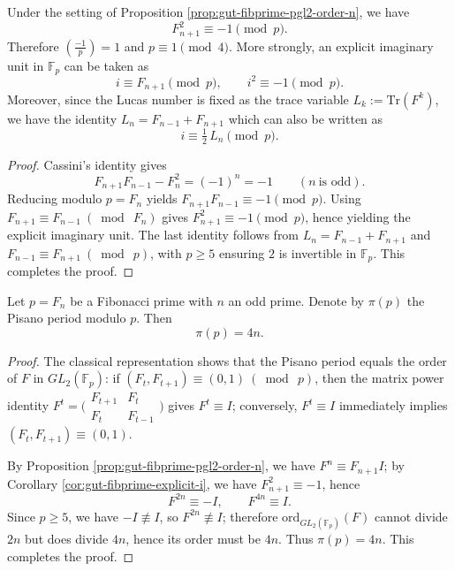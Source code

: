 \begin{corollary}\label{cor:gut-fibprime-explicit-i}
Under the setting of Proposition \ref{prop:gut-fibprime-pgl2-order-n}, we have
\[
F_{n+1}^2\equiv -1\pmod p.
\]
Therefore \(\left(\frac{-1}{p}\right)=1\) and \(p\equiv 1\pmod 4\).
More strongly, an explicit imaginary unit in \(\mathbb{F}_p\) can be taken as
\[
i\equiv F_{n+1}\pmod p,
\qquad i^2\equiv -1\pmod p.
\]
Moreover, since the Lucas number is fixed as the trace variable \(L_k:=\mathrm{Tr}(F^k)\), we have the identity
\(
L_n=F_{n-1}+F_{n+1}
\)
which can also be written as
\[
i\equiv \tfrac12\,L_n\pmod p.
\]
\end{corollary}
\begin{proof}
Cassini's identity gives
\[
F_{n+1}F_{n-1}-F_n^2=(-1)^n=-1
\qquad(n\ \text{is odd}).
\]
Reducing modulo \(p=F_n\) yields \(F_{n+1}F_{n-1}\equiv -1\pmod p\).
Using \(F_{n+1}\equiv F_{n-1}\ (\bmod\ F_n)\) gives \(F_{n+1}^2\equiv -1\pmod p\), hence yielding the explicit imaginary unit.
The last identity follows from \(L_n=F_{n-1}+F_{n+1}\) and \(F_{n-1}\equiv F_{n+1}\ (\bmod\ p)\), with \(p\ge 5\) ensuring \(2\) is invertible in \(\mathbb{F}_p\). This completes the proof.
\end{proof}

\begin{corollary}[Precise closure of Pisano period: \texorpdfstring{$\pi(p)=4n$}{pi(p)=4n}]\label{cor:gut-fibprime-pisano-4n}
Let \(p=F_n\) be a Fibonacci prime with \(n\) an odd prime.
Denote by \(\pi(p)\) the Pisano period modulo \(p\).
Then
\[
\pi(p)=4n.
\]
\end{corollary}
\begin{proof}
The classical representation shows that the Pisano period equals the order of \(F\) in \(GL_2(\mathbb{F}_p)\):
if \((F_t,F_{t+1})\equiv(0,1)\ (\bmod\ p)\), then the matrix power identity
\(
F^t=\bigl(\begin{smallmatrix}F_{t+1}&F_t\\F_t&F_{t-1}\end{smallmatrix}\bigr)
\)
gives \(F^t\equiv I\);
conversely, \(F^t\equiv I\) immediately implies \((F_t,F_{t+1})\equiv(0,1)\).
\par
By Proposition \ref{prop:gut-fibprime-pgl2-order-n}, we have \(F^n\equiv F_{n+1}I\);
by Corollary \ref{cor:gut-fibprime-explicit-i}, we have \(F_{n+1}^2\equiv -1\), hence
\[
F^{2n}\equiv -I,\qquad F^{4n}\equiv I.
\]
Since \(p\ge 5\), we have \(-I\not\equiv I\), so \(F^{2n}\not\equiv I\); therefore \(\mathrm{ord}_{GL_2(\mathbb{F}_p)}(F)\) cannot divide \(2n\) but does divide \(4n\), hence its order must be \(4n\).
Thus \(\pi(p)=4n\). This completes the proof.
\end{proof}

